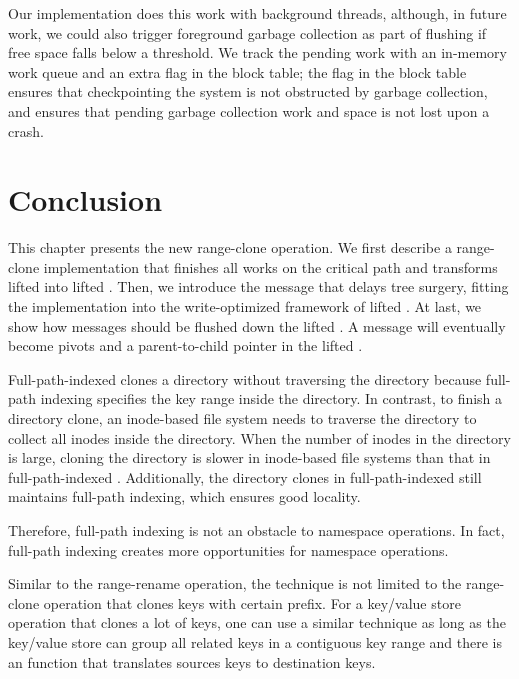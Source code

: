 Our \bedag implementation does this work with background threads,
although, in future work, we could also trigger foreground garbage collection
as part of flushing if free space falls below a threshold.
We track the pending work with an in-memory work queue and an extra flag in the block table;
the flag in the block table ensures that checkpointing the system is not obstructed by garbage collection,
and ensures that pending garbage collection work and space is not lost upon a crash.

\section{Conclusion}

This chapter presents the new range-clone operation.
We first describe a range-clone implementation that finishes all works
on the critical path and transforms lifted \bets into lifted \bedags.
Then, we introduce the \goto message that delays tree surgery,
fitting the implementation into the write-optimized framework of lifted \bedags.
At last, we show how \goto messages should be flushed down the lifted \bedags.
A \goto message will eventually become pivots and a parent-to-child pointer
in the lifted \bedag.

Full-path-indexed \betrfs clones a directory without traversing the directory
because full-path indexing specifies the key range inside the directory.
In contrast, to finish a directory clone,
an inode-based file system needs to traverse the directory to collect all inodes
inside the directory.
When the number of inodes in the directory is large,
cloning the directory is slower in inode-based file systems
than that in full-path-indexed \betrfs.
Additionally, the directory clones in full-path-indexed \betrfs
still maintains full-path indexing, which ensures good locality.

Therefore, full-path indexing is not an obstacle to namespace operations.
In fact, full-path indexing creates more opportunities for namespace operations.

Similar to the range-rename operation, the technique is not limited to the
range-clone operation that clones keys with certain prefix.
For a key/value store operation that clones a lot of keys,
one can use a similar technique as long as the key/value store can group all
related keys in a contiguous key range and
there is an \xf function that translates sources keys to destination keys.

